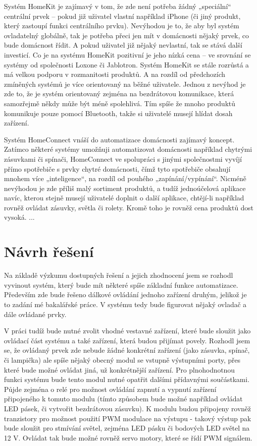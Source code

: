 Systém HomeKit je zajímavý v tom, že zde není potřeba žádný „speciální“ centrální prvek – pokud již uživatel vlastní například iPhone (či jiný produkt, který zastoupí funkci centrálního prvku). Nevýhodou je to, že aby byl systém ovladatelný globálně, tak je potřeba přeci jen mít v domácnosti nějaký prvek, co bude domácnost řídit. A pokud uživatel již nějaký nevlastní, tak se stává další investicí. Co je na systému HomeKit pozitivní je jeho nízká cena – ve srovnání se systémy od společnosti Loxone či Jablotron. Systém HomeKit se stále rozrůstá a má velkou podporu v rozmanitosti produktů. A na rozdíl od předchozích zmíněných systémů je více orientovaný na běžné uživatele. Jednou z nevýhod je zde to, že je systém orientovaný zejména na bezdrátovou komunikace, která samozřejmě někdy může být méně spolehlivá. Tím spíše že mnoho produktů komunikuje pouze pomocí Bluetooth, takže si uživatelé musejí hlídat dosah zařízení.\newline

Systém HomeConnect vnáší do automatizace domácnosti zajímavý koncept. Zatímco některé systémy umožňuji automatizovat domácnosti například chytrými zásuvkami či spínači, HomeConnect ve spolupráci s jinými společnostmi vyvíjí přímo spotřebiče s prvky chytré domácnosti, čímž tyto spotřebiče obsahují mnohem více „inteligence“, na rozdíl od pouhého „zapínání/vypínání“. Nicméně nevýhodou je zde příliš malý sortiment produktů, a tudíž jednoúčelová aplikace navíc, kterou stejně musejí uživatelé doplnit o další aplikace, chtějí-li například rovněž ovládat zásuvky, světla či rolety. Kromě toho je rovněž cena produktů dost vysoká.\newline
...

\section{Návrh řešení}
Na základě výzkumu dostupných řešení a jejich zhodnocení jsem se rozhodl vyvinout systém, který bude mít některé spíše základní funkce automatizace. Především zde bude řešeno dálkové ovládání jednoho zařízení druhým, jelikož je to zadání mé bakalářské práce. V systému tedy bude figurovat nějaký ovladač a dále ovládané prvky. 

V práci tudíž bude nutné zvolit vhodné vestavné zařízení, které bude sloužit jako ovládací část systému a také zařízení, která budou přijímat povely. Rozhodl jsem se, že ovládaný prvek zde nebude žádné konkrétní zařízení (jako zásuvka, spínač, či lampička) ale spíše nějaký obecný modul se vstupně výstupními porty, přes které bude možné ovládat jiná, už konkrétnější zařízení. Pro plnohodnotnou funkci systému bude tento modul nutné opatřit dalšími přídavnými součástkami. Půjde zejména o relé pro možnost ovládání zapnutí a vypnutí zařízení připojeného k tomuto modulu (tímto způsobem bude možné například ovládat LED pásek, či vytvořit bezdrátovou zásuvku). K modulu budou připojeny rovněž tranzistory pro možnost použití PWM modulace na výstupu - takový výstup pak bude sloužit pro stmívání světel, zejména LED pásku či bodových LED světel na 12 V. Ovládat tak bude možné rovněž servo motory, které se řídí PWM signálem.

